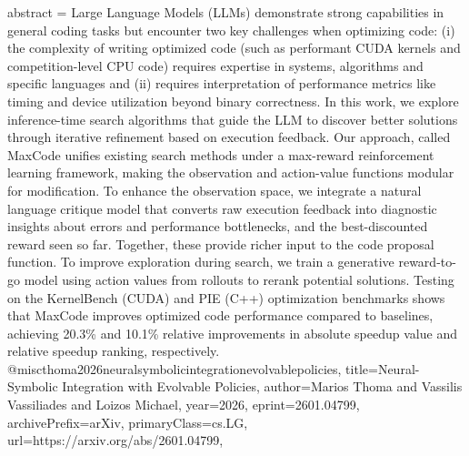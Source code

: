 {      abstract = {Large Language Models (LLMs) demonstrate strong capabilities in general coding tasks but encounter two key challenges when optimizing code: (i) the complexity of writing optimized code (such as performant CUDA kernels and competition-level CPU code) requires expertise in systems, algorithms and specific languages and (ii) requires interpretation of performance metrics like timing and device utilization beyond binary correctness. In this work, we explore inference-time search algorithms that guide the LLM to discover better solutions through iterative refinement based on execution feedback. Our approach, called MaxCode unifies existing search methods under a max-reward reinforcement learning framework, making the observation and action-value functions modular for modification. To enhance the observation space, we integrate a natural language critique model that converts raw execution feedback into diagnostic insights about errors and performance bottlenecks, and the best-discounted reward seen so far. Together, these provide richer input to the code proposal function. To improve exploration during search, we train a generative reward-to-go model using action values from rollouts to rerank potential solutions. Testing on the KernelBench (CUDA) and PIE (C++) optimization benchmarks shows that MaxCode improves optimized code performance compared to baselines, achieving 20.3\% and 10.1\% relative improvements in absolute speedup value and relative speedup ranking, respectively.}
}@misc{thoma2026neuralsymbolicintegrationevolvablepolicies,
      title={Neural-Symbolic Integration with Evolvable Policies}, 
      author={Marios Thoma and Vassilis Vassiliades and Loizos Michael},
      year={2026},
      eprint={2601.04799},
      archivePrefix={arXiv},
      primaryClass={cs.LG},
      url={https://arxiv.org/abs/2601.04799},
}
